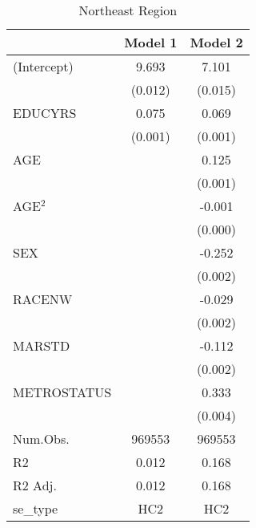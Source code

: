 \documentclass[12pt, English]{article}
\begin{document}
\begin{table}
\centering %
    \caption{Northeast Region}
    \vspace{7.5mm} %
\begin{tabular}[t]{lcc}
\toprule
 & Model 1 & Model 2\\
\midrule
(Intercept) & 9.693 & 7.101\\
 & (0.012) & (0.015)\\
EDUCYRS & 0.075 & 0.069\\
 & (0.001) & (0.001)\\
AGE &  & 0.125\\
 &  & (0.001)\\
AGE$^2$ &  & -0.001\\
 &  & (0.000)\\
SEX &  & -0.252\\
 &  & \vphantom{2} (0.002)\\
RACENW &  & -0.029\\
 &  & \vphantom{1} (0.002)\\
MARSTD &  & -0.112\\
 &  & (0.002)\\
METROSTATUS &  & 0.333\\
 &  & (0.004)\\
\midrule
Num.Obs. & 969553 & 969553\\
R2 & 0.012 & 0.168\\
R2 Adj. & 0.012 & 0.168\\
se\_type & HC2 & HC2\\
\bottomrule
\end{tabular}
\end{table}


\newpage
\end{document}
